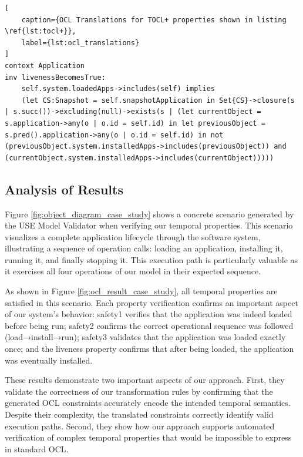 \begin{lstlisting}[
    caption={OCL Translations for TOCL+ properties shown in listing \ref{lst:tocl+}},
    label={lst:ocl_translations}
]
context Application
inv livenessBecomesTrue:
    self.system.loadedApps->includes(self) implies
    (let CS:Snapshot = self.snapshotApplication in Set{CS}->closure(s | s.succ())->excluding(null)->exists(s | (let currentObject = s.application->any(o | o.id = self.id) in let previousObject = s.pred().application->any(o | o.id = self.id) in not (previousObject.system.installedApps->includes(previousObject)) and (currentObject.system.installedApps->includes(currentObject)))))
\end{lstlisting}


\subsection{Analysis of Results}

\hspace{1cm} Figure \ref{fig:object_diagram_case_study} shows a concrete scenario 
generated by the USE Model Validator when verifying our temporal properties. This 
scenario visualizes a complete application lifecycle through the software system, 
illustrating a sequence of operation calls: loading an application, installing it, 
running it, and finally stopping it. This execution path is particularly valuable 
as it exercises all four operations of our model in their expected sequence.

As shown in Figure \ref{fig:ocl_result_case_study}, all temporal properties are 
satisfied in this scenario. Each property verification confirms an important aspect 
of our system's behavior: safety1 verifies that the application was indeed loaded 
before being run; safety2 confirms the correct operational sequence was followed 
(load→install→run); safety3 validates that the application was loaded exactly once; 
and the liveness property confirms that after being loaded, the application was 
eventually installed.

These results demonstrate two important aspects of our approach. First, they validate 
the correctness of our transformation rules by confirming that the generated OCL 
constraints accurately encode the intended temporal semantics. Despite their 
complexity, the translated constraints correctly identify valid execution paths. 
Second, they show how our approach supports automated verification of complex 
temporal properties that would be impossible to express in standard OCL.

